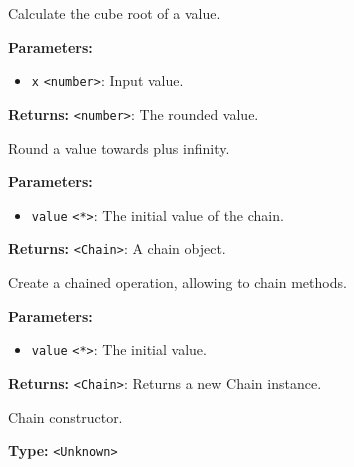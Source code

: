 \documentclass[12pt,a4paper]{article}
\begin{document}
\noindent Calculate the cube root of a value.

\vspace{5mm}
\noindent {}


\noindent \textbf{Parameters:}
\begin{itemize}
  \item \texttt{x} \texttt{<number>}: Input value.
\end{itemize}

\noindent \textbf{Returns:} \texttt{<number>}: The rounded value.

\noindent Round a value towards plus infinity.

\vspace{5mm}
\noindent {}


\noindent \textbf{Parameters:}
\begin{itemize}
  \item \texttt{value} \texttt{<*>}: The initial value of the chain.
\end{itemize}

\noindent \textbf{Returns:} \texttt{<Chain>}: A chain object.

\noindent Create a chained operation, allowing to chain methods.

\vspace{5mm}
\noindent {}


\noindent \textbf{Parameters:}
\begin{itemize}
  \item \texttt{value} \texttt{<*>}: The initial value.
\end{itemize}

\noindent \textbf{Returns:} \texttt{<Chain>}: Returns a new Chain instance.

\noindent Chain constructor.

\vspace{5mm}
\noindent {}\vspace{4mm}


\noindent \textbf{Type:} \texttt{<Unknown>}
\end{document}
